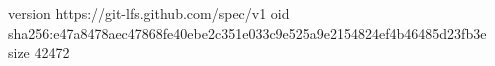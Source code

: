 version https://git-lfs.github.com/spec/v1
oid sha256:e47a8478aec47868fe40ebe2c351e033c9e525a9e2154824ef4b46485d23fb3e
size 42472
